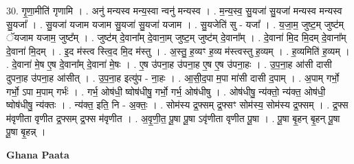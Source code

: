 \documentclass[17pt]{extarticle}
\begin{document}
30. गृ॒णा॒मीति॑ गृणामि । . अनु॑ मन्यस्व मन्य॒स्वा न्वनु॑ मन्यस्व । . म॒न्य॒स्व॒ सु॒यजा॑ सु॒यजा॑ मन्यस्व मन्यस्व सु॒यजा᳚ । . सु॒यजा॑ यजाम यजाम सु॒यजा॑ सु॒यजा॑ यजाम । . सु॒यजेति॑ सु - यजा᳚ । . य॒जा॒म॒ जुष्ट॒म् जुष्ट॑म् ॅयजाम यजाम॒ जुष्ट᳚म् । . जुष्ट॑म् दे॒वाना᳚म् दे॒वाना॒म् जुष्ट॒म् जुष्ट॑म् दे॒वाना᳚म् । . दे॒वाना॑ मि॒द मि॒दम् दे॒वाना᳚म् दे॒वाना॑ मि॒दम् । . इ॒द म॑स्त्व स्त्वि॒द मि॒द म॑स्तु । . अ॒स्तु॒ ह॒व्यꣳ ह॒व्य म॑स्त्वस्तु ह॒व्यम् । . ह॒व्यमिति॑ ह॒व्यम् । . दे॒वाना॑ मे॒ष ए॒ष दे॒वाना᳚म् दे॒वाना॑ मे॒षः । . ए॒ष उ॑पना॒ह उ॑पना॒ह ए॒ष ए॒ष उ॑पना॒हः । . उ॒प॒ना॒ह आ॑सी दासी दुपना॒ह उ॑पना॒ह आ॑सीत् । . उ॒प॒ना॒ह इत्यु॑प - ना॒हः । . आ॒सी॒द॒पा म॒पा मा॑सी दासी द॒पाम् । . अ॒पाम् गर्भो॒ गर्भो॒ ऽपा म॒पाम् गर्भः॑ । . गर्भ॒ ओष॑धी॒ ष्वोष॑धीषु॒ गर्भो॒ गर्भ॒ ओष॑धीषु । . ओष॑धीषु॒ न्य॑क्तो॒ न्य॑क्त॒ ओष॑धी॒ ष्वोष॑धीषु॒ न्य॑क्तः । . न्य॑क्त॒ इति॒ नि - अ॒क्तः॒ । . सोम॑स्य द्र॒फ्सम् द्र॒फ्सꣳ सोम॑स्य॒ सोम॑स्य द्र॒फ्सम् । . द्र॒फ्स म॑वृणीता वृणीत द्र॒फ्सम् द्र॒फ्स म॑वृणीत । . अ॒वृ॒णी॒त॒ पू॒षा पू॒षा ऽवृ॑णीता वृणीत पू॒षा । . पू॒षा बृ॒हन् बृ॒हन् पू॒षा पू॒षा बृ॒हन्न् । \newline

\textbf{Ghana Paata } \newline
\end{document}
